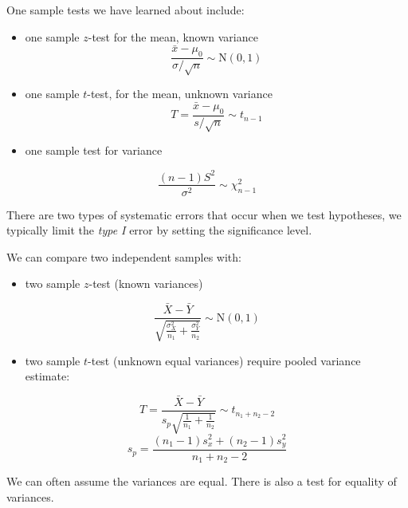 \documentclass[
]{book}
\providecommand{\tightlist}{%
  \setlength{\itemsep}{0pt}\setlength{\parskip}{0pt}}
\theoremstyle{definition}
\theoremstyle{definition}
\theoremstyle{definition}
\theoremstyle{definition}
\theoremstyle{remark}
\begin{document}
One sample tests we have learned about include:

\begin{itemize}
\item
  one sample \(z\)-test for the mean, known variance
  \[ \frac{\bar{x}-\mu_0}{\sigma/\sqrt{n}}\sim \text{N}(0,1) \]
\item
  one sample \(t\)-test, for the mean, unknown variance
  \[T = \frac{\bar{x}-\mu_0}{s/\sqrt{n}}\sim t_{n-1}\]
\item
  one sample test for variance
\end{itemize}

\[\frac{(n-1)S^2}{\sigma^2}\sim\chi^2_{n-1} \]

There are two types of systematic errors that occur when we test hypotheses, we typically limit the \emph{type I} error by setting the significance level.

We can compare two independent samples with:

\begin{itemize}
\tightlist
\item
  two sample \(z\)-test (known variances)
\end{itemize}

\[\frac{\bar{X} - \bar{Y}}{\sqrt{\frac{\sigma_X^2}{n_1} + \frac{\sigma_Y^2}{n_2}}}\sim \text{N}(0,1)\]

\begin{itemize}
\tightlist
\item
  two sample \(t\)-test (unknown equal variances) require pooled variance estimate:
\end{itemize}

\[T = \frac{\bar{X}-\bar{Y}}{s_p\sqrt{\frac{1}{n_1}+\frac{1}{n_2}}} \sim t_{n_1+n_2-2}\]
\[s_p = \frac{(n_1-1)s_x^2+(n_2-1)s_y^2}{n_1+n_2-2}\]

We can often assume the variances are equal. There is also a test for equality of variances.

  
\end{document}
